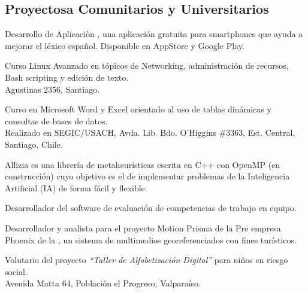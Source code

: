 \documentclass[11pt,letterpaper,roman]{moderncv}
\begin{document}
	
\subsection{Proyectosa Comunitarios y Universitarios}

 {\sd} {\ingennia} {\stgo} {}
{Desarrollo de Aplicaciòn \vocablia, una aplicación gratuita para smartphones que ayuda a mejorar el léxico español. Disponible en AppStore y Google Play.}


 {\tchr} {\ipgamma} {\stgo} {}
{Curso \sence Linux Avanzado en tópicos de Networking, administración de
recursos, Bash scripting y edición de texto. \\ Agustinas 2356, Santiago.}

 {\tchr} {\otecnewline} {\stgo} {}
{Curso \sence en Microsoft Word y Excel orientado al uso de tablas dinámicas y
consultas de bases de datos. \\ Realizado en SEGIC/USACH, Avda. Lib. Bdo. O'Higgins \#3363, Est. Central, Santiago, Chile.}

{Allizia es una librería de metaheurísticas escrita en C++ con OpenMP (en
construcción) cuyo objetivo es el de implementar problemas de la Inteligencia
Artificial (IA) de forma fácil y flexible. }

 { } {} {}
{Desarrollador del software de evaluación de competencias de trabajo en equipo.}



 {\sd} { } {} {}
{Desarrollador y analista para el proyecto Motion Prisma de la Pre empresa
Phoenix de la , un sistema de multimedios georeferenciados con fines
turísticos.}

 {\tchr} {\ernestoquiroz } {\valpo} {}
{Volutario del proyecto \textit{``Taller de Alfabetizaci\'on Digital''}
para niños en riesgo social. \\ Avenida Matta 64, Población el Progreso,
Valparaíso.}
	
	
%
\end{document}
